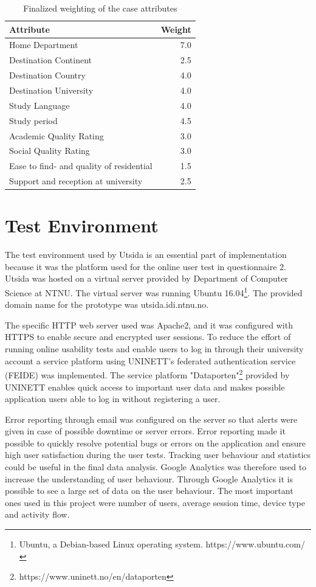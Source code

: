 \begin{table}[h]
\centering
\caption{Finalized weighting of the case attributes}
\label{tab:attribute_weights}
\begin{tabulary}{\textwidth}{|L|R|}
\hline
\textbf{Attribute} & \textbf{Weight} \\ \hline \hline
Home Department & 7.0 \\ \hline
Destination Continent & 2.5 \\ \hline
Destination Country & 4.0 \\ \hline
Destination University & 4.0 \\ \hline
Study Language & 4.0 \\ \hline
Study period & 4.5 \\ \hline
Academic Quality Rating & 3.0 \\ \hline
Social Quality Rating & 3.0 \\ \hline
Ease to find- and quality of residential & 1.5 \\ \hline
Support and reception at university & 2.5 \\ \hline
\end{tabulary}
\end{table}

\FloatBarrier
\section{Test Environment}
The test environment used by Utsida is an essential part of implementation because it was the platform used for the online user test in questionnaire 2. Utsida was hosted on a virtual server provided by Department of Computer Science at NTNU. The virtual server was running Ubuntu 16.04\footnote{Ubuntu, a Debian-based Linux operating system. https://www.ubuntu.com/}. The provided domain name for the prototype was utsida.idi.ntnu.no.

The specific HTTP web server used was Apache2, and it was configured with HTTPS to enable secure and encrypted user sessions. To reduce the effort of running online usability tests and enable users to log in through their university account a service platform using UNINETT's federated authentication service (FEIDE) was implemented. The service platform "Dataporten"\footnote{https://www.uninett.no/en/dataporten} provided by UNINETT enables quick access to important user data and makes possible application users able to log in without registering a user.

Error reporting through email was configured on the server so that alerts were given in case of possible downtime or server errors. Error reporting made it possible to quickly resolve potential bugs or errors on the application and ensure high user satisfaction during the user tests. Tracking user behaviour and statistics could be useful in the final data analysis. Google Analytics was therefore used to increase the understanding of user behaviour. Through Google Analytics it is possible to see a large set of data on the user behaviour. The most important ones used in this project were number of users, average session time, device type and activity flow.  

